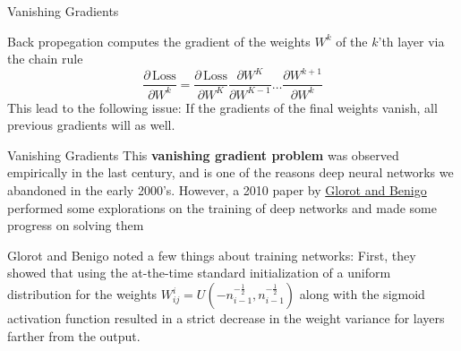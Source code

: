 \documentclass[10pt, table, dvipsnames,xcdraw,handout]{beamer}
\def\layersep{2.5cm}
\begin{document}
\begin{frame}[fragile]{Vanishing Gradients}
\begin{minipage}[t][0.5\textheight][t]{\textwidth}
  \end{minipage}
  \vfill
\begin{minipage}[t][0.5\textheight][t]{\textwidth}
Back propegation computes the gradient of the weights $W^k$ of the $k$'th layer via the chain rule
$$
\frac{\partial \, \text{Loss}}{\partial W^{k} } 
=
\frac{\partial \, \text{Loss}}{\partial W^{K} } 
\frac{\partial  W^{K}}{\partial W^{K-1} } 
\ldots
\frac{\partial  W^{k+1}}{\partial W^{k} } 
$$
This lead to the following issue: If the gradients of the final weights vanish, all previous gradients will as well.
\end{minipage}
\end{frame}







\begin{frame}[fragile]{Vanishing Gradients}
This \textbf{vanishing gradient problem} was observed empirically in the last century, and is one of the reasons deep neural networks we abandoned in the early 2000's. However, a 2010 paper by \href{http://proceedings.mlr.press/v9/glorot10a/glorot10a.pdf}{Glorot and Benigo} performed some explorations on the training of deep networks and made some progress on solving them

Glorot and Benigo noted a few things about training networks: First, they showed that using the at-the-time standard initialization of a uniform distribution for the weights $W^i_{ij} = U(-n_{i-1}^{-\frac12},n_{i-1}^{-\frac12})$ along with the sigmoid activation function resulted in a strict decrease in the weight variance for layers farther from the output. 

\end{frame}
\end{document}

